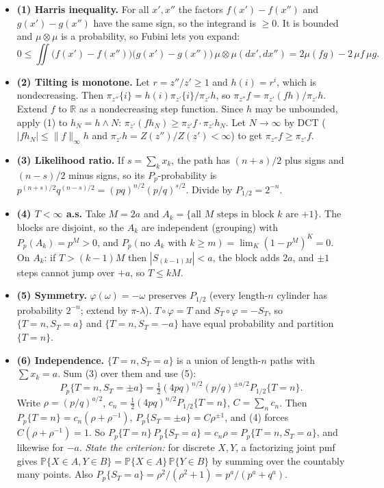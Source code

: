\documentclass[10pt]{article}
\newcommand{\R}{\mathbb{R}}
\newcommand{\norm}[1]{\lVert {#1} \rVert}
\begin{document}
\begin{itemize}[leftmargin=1.5em, itemsep=6pt]
\item \textbf{(1) Harris inequality.} For all $x',x''$ the factors $f(x')-f(x'')$ and $g(x')-g(x'')$ have the same sign, so the integrand is $\ge0$. It is bounded and $\mu\otimes\mu$ is a probability, so Fubini lets you expand:
\[
0\le\iint\big(f(x')-f(x'')\big)\big(g(x')-g(x'')\big)\,\mu\otimes\mu(dx',dx'')=2\mu(fg)-2\,\mu f\,\mu g .
\]
 
\item \textbf{(2) Tilting is monotone.} Let $r=z''/z'\ge1$ and $h(i)=r^i$, which is nondecreasing. Then $\pi_{z''}\{i\}=h(i)\pi_{z'}\{i\}/\pi_{z'}h$, so $\pi_{z''}f=\pi_{z'}(fh)/\pi_{z'}h$. Extend $f$ to $\R$ as a nondecreasing step function. Since $h$ may be unbounded, apply (1) to $h_N=h\wedge N$: $\pi_{z'}(fh_N)\ge\pi_{z'}f\cdot\pi_{z'}h_N$. Let $N\to\infty$ by DCT ($|fh_N|\le\norm{f}_\infty h$ and $\pi_{z'}h=Z(z'')/Z(z')<\infty$) to get $\pi_{z''}f\ge\pi_{z'}f$.
 
\item \textbf{(3) Likelihood ratio.} If $s=\sum_kx_k$, the path has $(n+s)/2$ plus signs and $(n-s)/2$ minus signs, so its $P_p$-probability is $p^{(n+s)/2}q^{(n-s)/2}=(pq)^{n/2}(p/q)^{s/2}$. Divide by $P_{1/2}=2^{-n}$.
 
\item \textbf{(4) $T<\infty$ a.s.} Take $M=2a$ and $A_k=\{\text{all $M$ steps in block $k$ are $+1$}\}$. The blocks are disjoint, so the $A_k$ are independent (grouping) with $P_p(A_k)=p^M>0$, and $P_p(\text{no }A_k\text{ with }k\ge m)=\lim_K(1-p^M)^K=0$. On $A_k$: if $T>(k-1)M$ then $|S_{(k-1)M}|<a$, the block adds $2a$, and $\pm1$ steps cannot jump over $+a$, so $T\le kM$.
 
\item \textbf{(5) Symmetry.} $\varphi(\omega)=-\omega$ preserves $P_{1/2}$ (every length-$n$ cylinder has probability $2^{-n}$; extend by $\pi$-$\lambda$). $T\circ\varphi=T$ and $S_T\circ\varphi=-S_T$, so $\{T=n,S_T=a\}$ and $\{T=n,S_T=-a\}$ have equal probability and partition $\{T=n\}$.
 
\item \textbf{(6) Independence.} $\{T=n,S_T=a\}$ is a union of length-$n$ paths with $\sum x_k=a$. Sum (3) over them and use (5):
\[
P_p\{T=n,S_T=\pm a\}=\tfrac12(4pq)^{n/2}(p/q)^{\pm a/2}P_{1/2}\{T=n\}.
\]
Write $\rho=(p/q)^{a/2}$, $c_n=\tfrac12(4pq)^{n/2}P_{1/2}\{T=n\}$, $C=\sum_nc_n$. Then $P_p\{T=n\}=c_n(\rho+\rho^{-1})$, $P_p\{S_T=\pm a\}=C\rho^{\pm1}$, and (4) forces $C(\rho+\rho^{-1})=1$. So $P_p\{T=n\}\,P_p\{S_T=a\}=c_n\rho=P_p\{T=n,S_T=a\}$, and likewise for $-a$. \emph{State the criterion:} for discrete $X,Y$, a factorizing joint pmf gives $\mathbb P\{X\in A,Y\in B\}=\mathbb P\{X\in A\}\,\mathbb P\{Y\in B\}$ by summing over the countably many points. Also $P_p\{S_T=a\}=\rho^2/(\rho^2+1)=p^a/(p^a+q^a)$.
 

\end{itemize}
\end{document}
